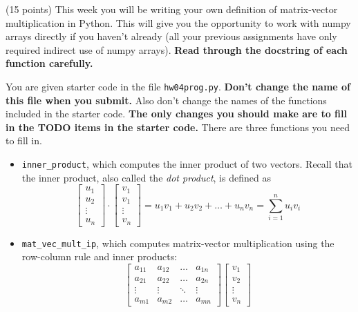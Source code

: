 \documentclass{article}
\theoremstyle{remark}
\begin{document}
(15 points) This week you will be writing your own definition of matrix-vector multiplication in Python.
This will give you the opportunity to work with numpy arrays directly if you haven't already (all your previous assignments have only required indirect use of numpy arrays).
\textbf{Read through the docstring of each function carefully.}

You are given starter code in the file \texttt{hw04prog.py}.
\textbf{Don't change the name of this file when you submit.}
Also don't change the names of the functions included in the starter code.
\textbf{The only changes you should make are to fill in the TODO items in the starter code.}
There are three functions you need to fill in.
\begin{itemize}
\item \texttt{inner\_product}, which computes the inner product of two vectors.
  Recall that the inner product, also called the \textit{dot product}, is defined as
  \begin{displaymath}
    \begin{bmatrix}
      u_1 \\ u_2 \\ \vdots \\ u_n
    \end{bmatrix}
    \cdot
    \begin{bmatrix}
      v_1 \\ v_1 \\ \vdots \\ v_n
    \end{bmatrix}
    =
    u_1 v_1 + u_2 v_2 + \dots + u_nv_n =
    \sum_{i = 1}^n u_i v_i
  \end{displaymath}
\item \texttt{mat\_vec\_mult\_ip}, which computes matrix-vector multiplication using the row-column rule and inner products:
  \begin{displaymath}
    \begin{bmatrix}
      a_{11} & a_{12} & \dots & a_{1n} \\
      a_{21} & a_{22} & \dots & a_{2n} \\
      \vdots & \vdots & \ddots & \vdots \\
      a_{m1} & a_{m2} & \dots & a_{mn}
    \end{bmatrix}
    \begin{bmatrix}
      v_1 \\ v_2 \\ \vdots \\ v_n
    \end{bmatrix}

\end{displaymath}
\end{itemize}
\end{document}
